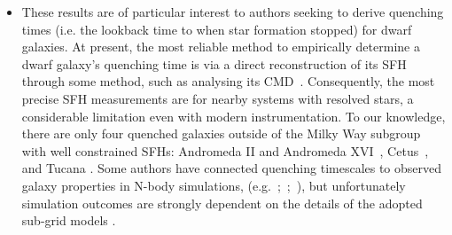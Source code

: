 \documentclass[ms.tex]{subfiles}
\begin{document}
\begin{itemize}
	\item These results are of particular interest to authors seeking to derive
	quenching times (i.e. the lookback time to when star formation stopped) for
	dwarf galaxies.
	At present, the most reliable method to empirically determine a dwarf
	galaxy's quenching time is via a direct reconstruction of its SFH through
	some method, such as analysing its CMD~\citep[e.g.][]{Sohn2013, Weisz2015}.
	Consequently, the most precise SFH measurements are for nearby systems with
	resolved stars, a considerable limitation even with modern instrumentation.
	To our knowledge, there are only four quenched galaxies outside of the
	Milky Way subgroup with well constrained SFHs: Andromeda II and Andromeda
	XVI~\citep{Weisz2014a}, Cetus~\citep{Monelli2010a}, and Tucana
	\citep{Monelli2010b}.
	Some authors have connected quenching timescales to observed galaxy
	properties in N-body simulations, (e.g.~\citealp{Phillips2014,
	Phillips2015};~\citealp*{Rocha2012};~\citealp{Slater2013, Slater2014,
	Wheeler2014}), but unfortunately simulation outcomes are strongly dependent
	on the details of the adopted sub-grid models
	\citep[see discussion in, e.g.,][]{Li2020}.


\end{itemize}
\end{document}
